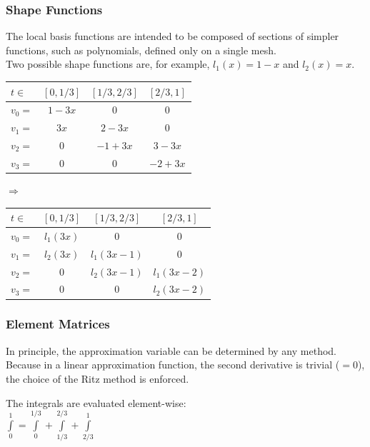 \subsubsection{Shape Functions}
The local basis functions are intended to be composed of sections of simpler functions, such as polynomials, defined only on a single mesh.\\
Two possible shape functions are, for example, $l_1(x)=1-x$ and $l_2(x)=x$.

\begin{minipage}{8cm}
	\begin{tabular}{lc|c|c}
	$t\in$&$[0,1/3]$&$[1/3,2/3]$&$[2/3,1]$\\
	\hline
	$v_0=$&$1-3x$&$0$&$0$\\
	$v_1=$&$3x$&$2-3x$&$0$\\
	$v_2=$&$0$&$-1+3x$&$3-3x$\\
	$v_3=$&$0$&$0$&$-2+3x$\\
	\end{tabular}
\end{minipage}
\hfill
\begin{minipage}{2cm}
$\Longrightarrow$
\end{minipage}
\hfill
\begin{minipage}{8cm}
	\begin{tabular}{lc|c|c}
	$t\in$&$[0,1/3]$&$[1/3,2/3]$&$[2/3,1]$\\
	\hline
	$v_0=$&$l_1(3x)$&$0$&$0$\\
	$v_1=$&$l_2(3x)$&$l_1(3x-1)$&$0$\\
	$v_2=$&$0$&$l_2(3x-1)$&$l_1(3x-2)$\\
	$v_3=$&$0$&$0$&$l_2(3x-2)$\\
	\end{tabular}
\end{minipage}


\subsubsection{Element Matrices}
In principle, the approximation variable can be determined by any method.
Because in a linear approximation function, the second derivative is trivial ($=0$),
the choice of the Ritz method is enforced.

The integrals are evaluated element-wise:\\

 $\int\limits_{0}^{1}{}=\int\limits_{0}^{1/3}{}+\int\limits_{1/3}^{2/3}{}+\int\limits_{2/3}^{1}{}$\\


